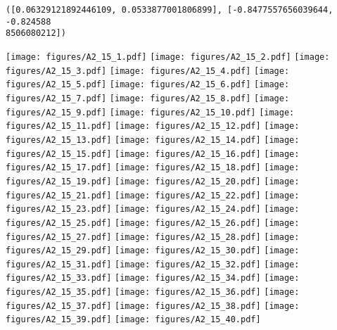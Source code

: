\documentclass[12pt,a4paper]{article}
\begin{document}
\begin{lstlisting}
([0.06329121892446109, 0.0533877001806899], [-0.8477557656039644, -0.824588
8506080212])
\end{lstlisting}

\texttt{[image: figures/A2\_15\_1.pdf]}
\texttt{[image: figures/A2\_15\_2.pdf]}
\texttt{[image: figures/A2\_15\_3.pdf]}
\texttt{[image: figures/A2\_15\_4.pdf]}
\texttt{[image: figures/A2\_15\_5.pdf]}
\texttt{[image: figures/A2\_15\_6.pdf]}
\texttt{[image: figures/A2\_15\_7.pdf]}
\texttt{[image: figures/A2\_15\_8.pdf]}
\texttt{[image: figures/A2\_15\_9.pdf]}
\texttt{[image: figures/A2\_15\_10.pdf]}
\texttt{[image: figures/A2\_15\_11.pdf]}
\texttt{[image: figures/A2\_15\_12.pdf]}
\texttt{[image: figures/A2\_15\_13.pdf]}
\texttt{[image: figures/A2\_15\_14.pdf]}
\texttt{[image: figures/A2\_15\_15.pdf]}
\texttt{[image: figures/A2\_15\_16.pdf]}
\texttt{[image: figures/A2\_15\_17.pdf]}
\texttt{[image: figures/A2\_15\_18.pdf]}
\texttt{[image: figures/A2\_15\_19.pdf]}
\texttt{[image: figures/A2\_15\_20.pdf]}
\texttt{[image: figures/A2\_15\_21.pdf]}
\texttt{[image: figures/A2\_15\_22.pdf]}
\texttt{[image: figures/A2\_15\_23.pdf]}
\texttt{[image: figures/A2\_15\_24.pdf]}
\texttt{[image: figures/A2\_15\_25.pdf]}
\texttt{[image: figures/A2\_15\_26.pdf]}
\texttt{[image: figures/A2\_15\_27.pdf]}
\texttt{[image: figures/A2\_15\_28.pdf]}
\texttt{[image: figures/A2\_15\_29.pdf]}
\texttt{[image: figures/A2\_15\_30.pdf]}
\texttt{[image: figures/A2\_15\_31.pdf]}
\texttt{[image: figures/A2\_15\_32.pdf]}
\texttt{[image: figures/A2\_15\_33.pdf]}
\texttt{[image: figures/A2\_15\_34.pdf]}
\texttt{[image: figures/A2\_15\_35.pdf]}
\texttt{[image: figures/A2\_15\_36.pdf]}
\texttt{[image: figures/A2\_15\_37.pdf]}
\texttt{[image: figures/A2\_15\_38.pdf]}
\texttt{[image: figures/A2\_15\_39.pdf]}
\texttt{[image: figures/A2\_15\_40.pdf]}
\end{document}
